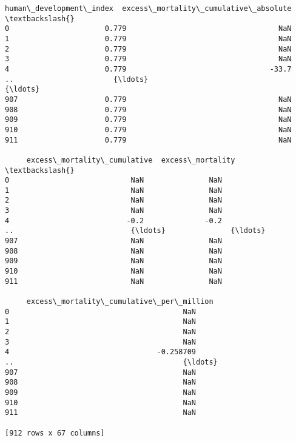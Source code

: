 \documentclass[11pt]{article}
\begin{document}
\begin{tcolorbox}[breakable, size=fbox, boxrule=.5pt, pad at break*=1mm, opacityfill=0]
\begin{Verbatim}[commandchars=\\\{\}]
     human\_development\_index  excess\_mortality\_cumulative\_absolute  \textbackslash{}
0                      0.779                                   NaN
1                      0.779                                   NaN
2                      0.779                                   NaN
3                      0.779                                   NaN
4                      0.779                                 -33.7
..                       {\ldots}                                   {\ldots}
907                    0.779                                   NaN
908                    0.779                                   NaN
909                    0.779                                   NaN
910                    0.779                                   NaN
911                    0.779                                   NaN

     excess\_mortality\_cumulative  excess\_mortality  \textbackslash{}
0                            NaN               NaN
1                            NaN               NaN
2                            NaN               NaN
3                            NaN               NaN
4                           -0.2              -0.2
..                           {\ldots}               {\ldots}
907                          NaN               NaN
908                          NaN               NaN
909                          NaN               NaN
910                          NaN               NaN
911                          NaN               NaN

     excess\_mortality\_cumulative\_per\_million
0                                        NaN
1                                        NaN
2                                        NaN
3                                        NaN
4                                  -0.258709
..                                       {\ldots}
907                                      NaN
908                                      NaN
909                                      NaN
910                                      NaN
911                                      NaN

[912 rows x 67 columns]
\end{Verbatim}
\end{tcolorbox}
        
\end{document}
